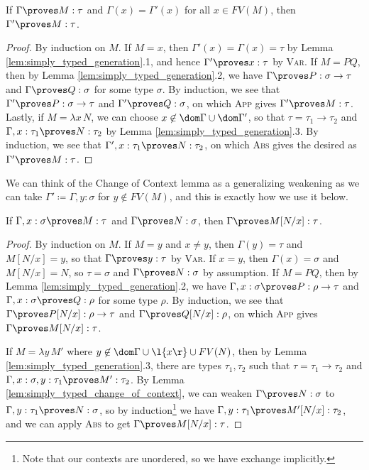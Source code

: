 \documentclass[reqno]{amsart}
\begin{document}
    \begin{lemma}\label{lem:simply_typed_change_of_context}
        If $\Gamma\proves M:\tau$ and $\Gamma(x)=\Gamma'(x)$ for all $x\in FV(M)$, then $\Gamma'\proves M:\tau$.
    \end{lemma}
    \begin{proof}
        By induction on $M$. If $M=x$, then $\Gamma'(x)=\Gamma(x)=\tau$ by Lemma \ref{lem:simply_typed_generation}.1, and hence $\Gamma'\proves x:\tau$ by \textsc{Var}. If $M=PQ$, then by Lemma \ref{lem:simply_typed_generation}.2, we have $\Gamma\proves P:\sigma\rightarrow\tau$ and $\Gamma\proves Q:\sigma$ for some type $\sigma$. By induction, we see that $\Gamma'\proves P:\sigma\to\tau$ and $\Gamma'\proves Q:\sigma$, on which \textsc{App} gives $\Gamma'\proves M:\tau$. Lastly, if $M=\lambda x\,N$, we can choose $x\not\in\dom\Gamma\cup\dom\Gamma'$, so that $\tau=\tau_1\rightarrow\tau_2$ and $\Gamma,x:\tau_1\proves N:\tau_2$ by Lemma \ref{lem:simply_typed_generation}.3. By induction, we see that $\Gamma',x:\tau_1\proves N:\tau_2$, on which \textsc{Abs} gives the desired as $\Gamma'\proves M:\tau$.
    \end{proof}

    We can think of the Change of Context lemma as a generalizing weakening as we can take $\Gamma'\coloneqq\Gamma,y:\sigma$ for $y\not\in FV(M)$, and this is exactly how we use it below.

    \begin{lemma}\label{lem:simply_typed_substitution}
        If $\Gamma,x:\sigma\proves M:\tau$ and $\Gamma\proves N:\sigma$, then $\Gamma\proves M[N/x]:\tau$.
    \end{lemma}
    \begin{proof}
        By induction on $M$. If $M=y$ and $x\neq y$, then $\Gamma(y)=\tau$ and $M[N/x]=y$, so that $\Gamma\proves y:\tau$ by \textsc{Var}. If $x=y$, then $\Gamma(x)=\sigma$ and $M[N/x]=N$, so $\tau=\sigma$ and $\Gamma\proves N:\sigma$ by assumption. If $M=PQ$, then by Lemma \ref{lem:simply_typed_generation}.2, we have $\Gamma,x:\sigma\proves P:\rho\rightarrow\tau$ and $\Gamma,x:\sigma\proves Q:\rho$ for some type $\rho$. By induction, we see that $\Gamma\proves P[N/x]:\rho\to\tau$ and $\Gamma\proves Q[N/x]:\rho$, on which \textsc{App} gives $\Gamma\proves M[N/x]:\tau$.

        If $M=\lambda y\,M'$ where $y\not\in\dom\Gamma\cup\l\{x\r\}\cup FV(N)$, then by Lemma \ref{lem:simply_typed_generation}.3, there are types $\tau_1,\tau_2$ such that $\tau=\tau_1\rightarrow\tau_2$ and $\Gamma,x:\sigma,y:\tau_1\proves M':\tau_2$. By Lemma \ref{lem:simply_typed_change_of_context}, we can weaken $\Gamma\proves N:\sigma$ to $\Gamma,y:\tau_1\proves N:\sigma$, so by induction\footnote{Note that our contexts are unordered, so we have exchange implicitly.} we have $\Gamma,y:\tau_1\proves M'[N/x]:\tau_2$, and we can apply \textsc{Abs} to get $\Gamma\proves M[N/x]:\tau$.
    \end{proof}
\end{document}
